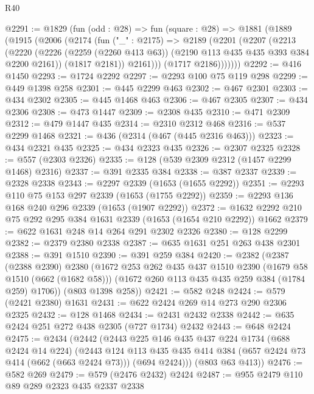 \begin{lexlean}{R40}
\begin{coremodule}
@2291 := @1829
    (fun (odd : @28) =>
    fun (square : @28) =>
    @1881
      (@1889
        (@1915
          (@2006
            (@2174
              (fun ("_" : @2175) =>
              @2189
                (@2201
                  (@2207
                    (@2213
                      (@2220
                        (@2226
                          (@2259 (@2260 @413 @63))
                          (@2190 @113 @435 @435 @393 @384 @2200 @2161))
                        (@1817 @2181))
                      @2161)))
                (@1717 @2186)))))))
@2292 := @416 @1450
@2293 := @1724 @2292
@2297 := @2293 @100 @75 @119 @298
@2299 := @449 @1398 @258
@2301 := @445 @2299 @463
@2302 := @467 @2301
@2303 := @434 @2302
@2305 := @445 @1468 @463
@2306 := @467 @2305
@2307 := @434 @2306
@2308 := @473 @1447
@2309 := @2308 @435
@2310 := @471 @2309
@2312 := @479 @1447 @435
@2314 := @2310 @2312 @468
@2316 := @537 @2299 @1468
@2321 := @436 (@2314 (@467 (@445 @2316 @463)))
@2323 := @434 @2321 @435
@2325 := @434 @2323 @435
@2326 := @2307 @2325
@2328 := @557 (@2303 @2326)
@2335 := @128 (@539 @2309 @2312 (@1457 @2299 @1468) @2316)
@2337 := @391 @2335 @384
@2338 := @387 @2337
@2339 := @2328 @2338
@2343 := @2297 @2339 (@1653 (@1655 @2292))
@2351 := @2293 @110 @75 @153 @297 @2339 (@1653 (@1755 @2292))
@2359 := @2293 @136 @168 @240 @296 @2339 (@1653 (@1907 @2292))
@2372 := @1632 @2292 @210 @75 @292 @295 @384 @1631 @2339 (@1653 (@1654 @210 @2292)) @1662
@2379 := @622 @1631 @248 @14 @264 @291 @2302 @2326
@2380 := @128 @2299
@2382 := @2379 @2380 @2338
@2387 := @635 @1631 @251 @263 @438 @2301
@2388 := @391 @1510
@2390 := @391 @259 @384
@2420 := @2382
    (@2387
      (@2388 @2390)
      @2380
      (@1672
        @253
        @262
        @435
        @437
        @1510
        @2390
        (@1679 @58 @1510 (@662 (@1682 @58)))
        (@1672 @260 @113 @435 @435 @259 @384 (@1784 @259) @1706))
      (@803 @1398 @258))
@2421 := @582 @248
@2424 := @579 (@2421 @2380) @1631
@2431 := @622 @2424 @269 @14 @273 @290 @2306 @2325
@2432 := @128 @1468
@2434 := @2431 @2432 @2338
@2442 := @635 @2424 @251 @272 @438 @2305 (@727 @1734) @2432
@2443 := @648 @2424
@2475 := @2434
    (@2442
      (@2443
        @225
        @146
        @435
        @437
        @224
        @1734
        (@688 @2424 @14 @224)
        (@2443
          @124
          @113
          @435
          @435
          @414
          @384
          (@657 @2424 @73 @414 (@662 (@663 @2424 @73)))
          (@694 @2424)))
      (@803 @63 @413))
@2476 := @582 @269
@2479 := @579 (@2476 @2432) @2424
@2487 := @955 @2479 @110 @89 @289 @2323 @435 @2337 @2338

\end{coremodule}
\end{lexlean}
